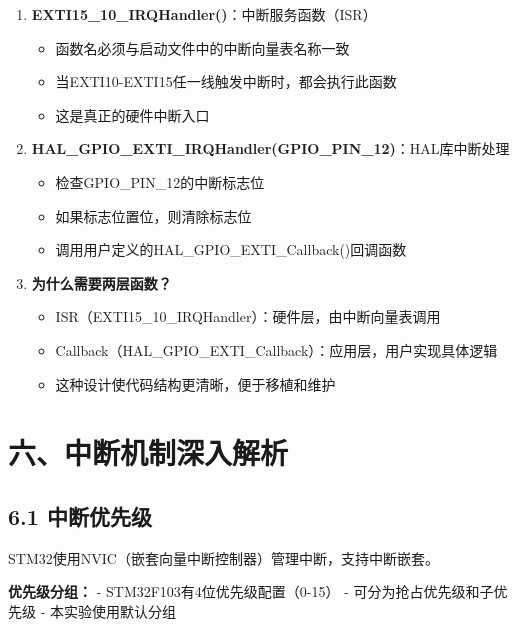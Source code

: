 \documentclass[
  chinese,
  UTF8,
  oneside,
  openany]{ctexbook}
\providecommand{\tightlist}{%
  \setlength{\itemsep}{0pt}\setlength{\parskip}{0pt}}
\begin{document}
\begin{enumerate}
\def\labelenumi{\arabic{enumi}.}
\tightlist
\item
  \textbf{EXTI15\_10\_IRQHandler()}：中断服务函数（ISR）

  \begin{itemize}
  \tightlist
  \item
    函数名必须与启动文件中的中断向量表名称一致
  \item
    当EXTI10-EXTI15任一线触发中断时，都会执行此函数
  \item
    这是真正的硬件中断入口
  \end{itemize}
\item
  \textbf{HAL\_GPIO\_EXTI\_IRQHandler(GPIO\_PIN\_12)}：HAL库中断处理

  \begin{itemize}
  \tightlist
  \item
    检查GPIO\_PIN\_12的中断标志位
  \item
    如果标志位置位，则清除标志位
  \item
    调用用户定义的HAL\_GPIO\_EXTI\_Callback()回调函数
  \end{itemize}
\item
  \textbf{为什么需要两层函数？}

  \begin{itemize}
  \tightlist
  \item
    ISR（EXTI15\_10\_IRQHandler）：硬件层，由中断向量表调用
  \item
    Callback（HAL\_GPIO\_EXTI\_Callback）：应用层，用户实现具体逻辑
  \item
    这种设计使代码结构更清晰，便于移植和维护
  \end{itemize}
\end{enumerate}

\section{六、中断机制深入解析}\label{ux516dux4e2dux65adux673aux5236ux6df1ux5165ux89e3ux6790}

\subsection{6.1 中断优先级}\label{ux4e2dux65adux4f18ux5148ux7ea7}

STM32使用NVIC（嵌套向量中断控制器）管理中断，支持中断嵌套。

\textbf{优先级分组：} - STM32F103有4位优先级配置（0-15） -
可分为抢占优先级和子优先级 - 本实验使用默认分组
\end{document}
